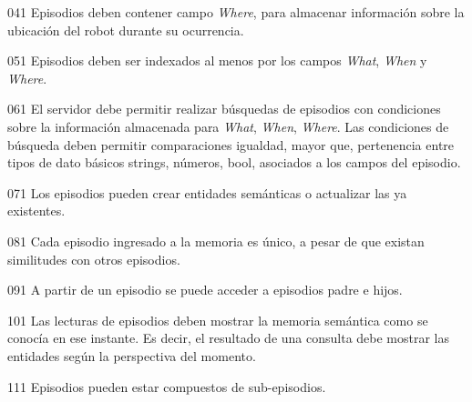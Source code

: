 \begin{requisito-sistema}{04}{1}
	Episodios deben contener campo \textit{Where}, para almacenar información sobre la ubicación del robot durante su ocurrencia.	
\end{requisito-sistema}

\begin{requisito-sistema}{05}{1}
	Episodios deben ser indexados al menos por los campos \textit{What}, \textit{When} y \textit{Where}.
\end{requisito-sistema}

\begin{requisito-sistema}{06}{1}
	El servidor debe permitir realizar búsquedas de episodios con condiciones sobre la información almacenada para \textit{What}, \textit{When}, \textit{Where}. Las condiciones de búsqueda deben permitir comparaciones {igualdad, mayor que, pertenencia} entre tipos de dato básicos {strings, números, bool}, asociados a los campos del episodio.
\end{requisito-sistema}

\begin{requisito-sistema}{07}{1}
	Los episodios pueden crear entidades semánticas o actualizar las ya existentes.	
\end{requisito-sistema}

\begin{requisito-sistema}{08}{1}
	Cada episodio ingresado a la memoria es único, a pesar de que existan similitudes con otros episodios.	
\end{requisito-sistema}

\begin{requisito-sistema}{09}{1}
	A partir de un episodio se puede acceder a episodios padre e hijos.	
\end{requisito-sistema}

\begin{requisito-sistema}{10}{1}
	Las lecturas de episodios deben mostrar la memoria semántica como se conocía en ese instante. Es decir, el resultado de una consulta debe mostrar las entidades según la perspectiva del momento.
\end{requisito-sistema}

\begin{requisito-sistema}{11}{1}
	Episodios pueden estar compuestos de sub-episodios.
\end{requisito-sistema}

